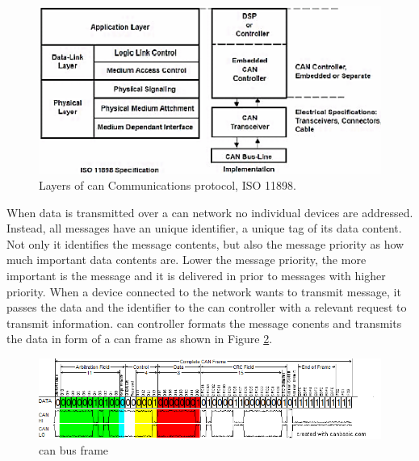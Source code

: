 \begin{figure}[H]
\begin{center}
\captionsetup{font=small}
\includegraphics[scale=0.5]{pics/iso_osi_can.png}
\caption{Layers of \gls{can} Communications protocol, ISO 11898\cite{5116731}.}
\label{fig:iso_osi_can}
\end{center}
\end{figure}
When data is transmitted over a \gls{can} network no individual devices are addressed. Instead, all messages have an unique identifier, a unique tag of its data content. Not only it identifies the message contents, but also the message priority as how much important data contents are. Lower the message priority, the more important is the message and it is delivered in prior to messages with higher priority. When a device connected to the network wants to transmit message, it passes the data and the identifier to the \gls{can} controller with a relevant request to transmit information. \gls{can} controller formats the message conents and transmits the data in form of a \gls{can} frame as shown in Figure \ref{fig:can_bus_frame}.
\begin{figure}[H]
\begin{center}
\captionsetup{font=small}
\includegraphics[scale=0.55]{pics/can_bus_frame.png}
\caption{\gls{can} bus frame \cite{can_frame_pic}}
\label{fig:can_bus_frame}
\end{center}
\end{figure}
